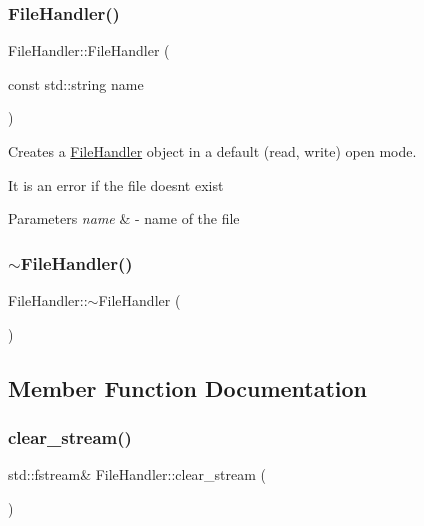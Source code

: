 \subsubsection{\texorpdfstring{File\+Handler()}{FileHandler()}\hspace{0.1cm}{\footnotesize\ttfamily [3/3]}}
{\footnotesize\ttfamily File\+Handler\+::\+File\+Handler (\begin{DoxyParamCaption}\item[{const std\+::string}]{name }\end{DoxyParamCaption})\hspace{0.3cm}{\ttfamily [inline]}}



Creates a \hyperlink{classFileHandler}{File\+Handler} object in a default (read, write) open mode. 

It is an error if the file doesn\textquotesingle{}t exist 
\begin{DoxyParams}{Parameters}
{\em name} & -\/ name of the file \\
\hline
\end{DoxyParams}
\mbox{\label{classFileHandler_a1ce10cd0ad31b313a8d526fba6f1e676}} 
\subsubsection{\texorpdfstring{$\sim$\+File\+Handler()}{~FileHandler()}}
{\footnotesize\ttfamily File\+Handler\+::$\sim$\+File\+Handler (\begin{DoxyParamCaption}{ }\end{DoxyParamCaption})}



\subsection{Member Function Documentation}
\mbox{\label{classFileHandler_a3ca63e1acff7135dd79f0da5534a0a29}} 
\subsubsection{\texorpdfstring{clear\+\_\+stream()}{clear\_stream()}}
{\footnotesize\ttfamily std\+::fstream\& File\+Handler\+::clear\+\_\+stream (\begin{DoxyParamCaption}{ }\end{DoxyParamCaption})\hspace{0.3cm}{\ttfamily [inline]}}



